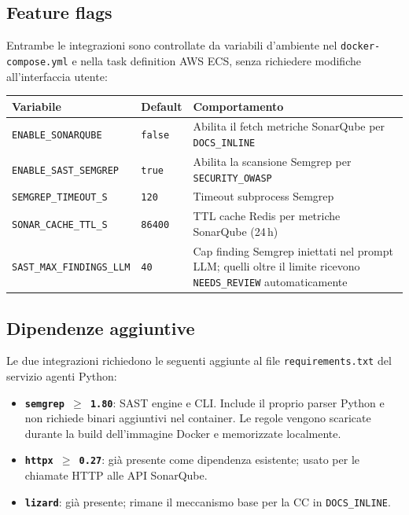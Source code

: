 \documentclass[11pt,a4paper]{article}
\begin{document}
\subsection{Feature flags}
\label{ssec:be-as-flags}

Entrambe le integrazioni sono controllate da variabili d'ambiente nel \texttt{docker-compose.yml} e nella task definition AWS ECS, senza richiedere modifiche all'interfaccia utente:

\begin{center}
\begin{tabular}{lll}
\toprule
Variabile & Default & Comportamento \\
\midrule
\texttt{ENABLE\_SONARQUBE} & \texttt{false} & Abilita il fetch metriche SonarQube per \texttt{DOCS\_INLINE} \\
\texttt{ENABLE\_SAST\_SEMGREP} & \texttt{true} & Abilita la scansione Semgrep per \texttt{SECURITY\_OWASP} \\
\texttt{SEMGREP\_TIMEOUT\_S} & \texttt{120} & Timeout subprocess Semgrep \\
\texttt{SONAR\_CACHE\_TTL\_S} & \texttt{86400} & TTL cache Redis per metriche SonarQube (24\,h) \\
\texttt{SAST\_MAX\_FINDINGS\_LLM} & \texttt{40} & Cap finding Semgrep iniettati nel prompt LLM; quelli oltre il limite ricevono \texttt{NEEDS\_REVIEW} automaticamente \\
\bottomrule
\end{tabular}
\end{center}

\subsection{Dipendenze aggiuntive}
\label{ssec:be-as-deps}

Le due integrazioni richiedono le seguenti aggiunte al file \texttt{requirements.txt} del servizio agenti Python:

\begin{itemize}
  \item \textbf{\texttt{semgrep $\geq$ 1.80}}: SAST engine e CLI. Include il proprio parser Python e non richiede binari aggiuntivi nel container. Le regole vengono scaricate durante la build dell'immagine Docker e memorizzate localmente.
  \item \textbf{\texttt{httpx $\geq$ 0.27}}: già presente come dipendenza esistente; usato per le chiamate HTTP alle API SonarQube.
  \item \textbf{\texttt{lizard}}: già presente; rimane il meccanismo base per la CC in \texttt{DOCS\_INLINE}.
\end{itemize}
\end{document}
